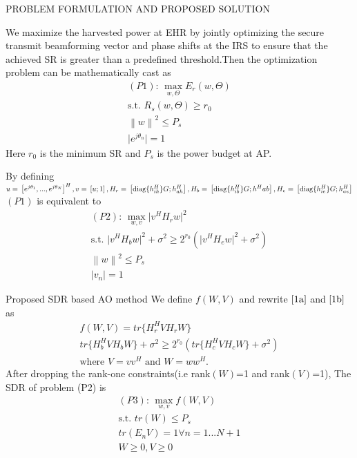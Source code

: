 \documentclass{beamer}
\newcommand\norm[1]{\left\lVert#1\right\rVert}
\providecommand{\brak}[1]{\ensuremath{\left(#1\right)}}
\providecommand{\abs}[1]{\vert#1\vert}
\providecommand{\sbrak}[1]{\ensuremath{{}\left[#1\right]}}
\begin{document}
\begin{frame}{}
\begin{center}
    PROBLEM FORMULATION AND PROPOSED SOLUTION
\end{center}
\end{frame}
\begin{frame}{}
    We maximize the harvested power at EHR by
jointly optimizing the secure transmit beamforming vector and
phase shifts at the IRS to ensure that the achieved SR is greater than a predefined threshold.Then the optimization
problem can be mathematically cast as
\begin{align}
    \brak{P1}\text{: }\mathop{max}_{w,\Theta} E_{r}\brak{w,\Theta}\\
    \text{s.t. }R_{s}\brak{w,\Theta}\geq r_{0}\\
    \norm{w}^{2}\leq P_{s}\\
    \abs{e^{j\theta_{n}}}=1
\end{align}
Here $r_{0}$ is the minimum SR and $P_{s}$ is the power budget at AP.
\end{frame}
\begin{frame}{}
By defining
    $u=\sbrak{e^{j\theta_{1}} , \text{...}, e^{j\theta_{N}}}^{H},
    v=\sbrak{u; 1},\\
    H_{r}=\sbrak{\text{diag}\{h^{H}_{ih}\}G;h^{H}_{ah}},
    H_{b}=\sbrak{\text{diag}\{h^{H}_{ib}\}G; h^{H}{ab}},
    H_{e}=\sbrak{\text{diag}\{h^{H}_{ie}\}G; h^{H}_{ae}}$
    $\brak{P1}$ is equivalent to\\
\begin{align}
    \brak{P2}\text{: }\mathop{max}_{w,v} \abs{v^{H}H_{r}w}^2 \label{1a}\\ 
    \text{s.t. } \abs{v^{H}H_{b}w}^{2}+\sigma^{2}\geq 2^{r_{0}}\brak{ \abs{v^{H}H_{e}w}^{2}+\sigma^{2}}\label{1b}\\
    \norm{w}^{2}\leq P_{s}\\
    \abs{v_{n}}=1
\end{align}
\end{frame}
\begin{frame}{Proposed SDR based AO method}
    We define $f\brak{W,V}$ and rewrite $\eqref{1a}$ and $\eqref{1b}$ as
    \begin{align}
        f\brak{W,V}=tr\{H_{r}^{H}VH_{r}W\}\\
        tr\{H_{b}^{H}VH_{b}W\}+ \sigma^{2}\geq 2^{r_{0}}\brak{tr\{H_{c}^{H}VH_{c}W\}+\sigma^{2}}\\
        \text{where }V=vv^{H} \text{ and }W=ww^{H}.
    \end{align}
    After dropping the rank-one constraints(i.e rank$\brak{W}$=1 and rank$\brak{V}$=1), The SDR of problem (P2) is 
\begin{align}
    \brak{P3}\text{: }\mathop{max}_{w,v}  f(W,V)\\ 
    \text{s.t. } tr\brak{W}\leq P_{s}\\
    tr\brak{E_{n}V}=1 \forall n=1 \text{...}N+1\\
    W\geq0, V\geq0
\end{align}
\end{frame}
\end{document}
